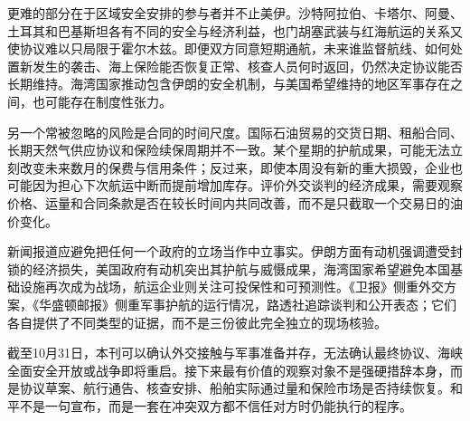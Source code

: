 \documentclass[10pt]{article}
\begin{document}
\begin{documents}
更难的部分在于区域安全安排的参与者并不止美伊。沙特阿拉伯、卡塔尔、阿曼、土耳其和巴基斯坦各有不同的安全与经济利益，也门胡塞武装与红海航运的关系又使协议难以只局限于霍尔木兹。即便双方同意短期通航，未来谁监督航线、如何处置新发生的袭击、海上保险能否恢复正常、核查人员何时返回，仍然决定协议能否长期维持。海湾国家推动包含伊朗的安全机制，与美国希望维持的地区军事存在之间，也可能存在制度性张力。

另一个常被忽略的风险是合同的时间尺度。国际石油贸易的交货日期、租船合同、长期天然气供应协议和保险续保周期并不一致。某个星期的护航成果，可能无法立刻改变未来数月的保费与信用条件；反过来，即使本周没有新的重大损毁，企业也可能因为担心下次航运中断而提前增加库存。评价外交谈判的经济成果，需要观察价格、运量和合同条款是否在较长时间内共同改善，而不是只截取一个交易日的油价变化。

新闻报道应避免把任何一个政府的立场当作中立事实。伊朗方面有动机强调遭受封锁的经济损失，美国政府有动机突出其护航与威慑成果，海湾国家希望避免本国基础设施再次成为战场，航运企业则关注可投保性和可预测性。《卫报》侧重外交方案，《华盛顿邮报》侧重军事护航的运行情况，路透社追踪谈判和公开表态；它们各自提供了不同类型的证据，而不是三份彼此完全独立的现场核验。

截至10月31日，本刊可以确认外交接触与军事准备并存，无法确认最终协议、海峡全面安全开放或战争即将重启。接下来最有价值的观察对象不是强硬措辞本身，而是协议草案、航行通告、核查安排、船舶实际通过量和保险市场是否持续恢复。和平不是一句宣布，而是一套在冲突双方都不信任对方时仍能执行的程序。

\begin{center}


\end{center}
\end{documents}
\end{document}
